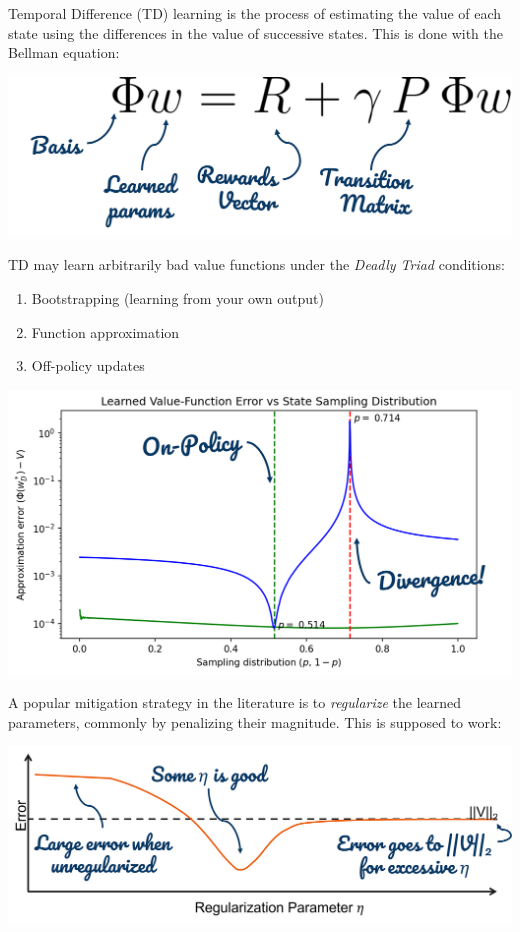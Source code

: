 
Temporal Difference (TD) learning is the process of estimating the value of each state using the differences in the value of successive states. This is done with the Bellman equation:
\begin{center}
    \includegraphics[scale=0.4]{parts/intro/bellman}
\end{center}
TD may learn arbitrarily bad value functions under the \emph{Deadly Triad} conditions:
\begin{enumerate}
    \item Bootstrapping (learning from your own output)
    \item Function approximation
    \item Off-policy updates
\end{enumerate}
\begin{center}
    \includegraphics[scale=0.4]{parts/intro/threestatedivergence}
\end{center}
A popular mitigation strategy in the literature is to \emph{regularize} the learned parameters, commonly by penalizing their magnitude. This is supposed to work:
\begin{center}
    \includegraphics[scale=0.4]{parts/intro/regworks}
\end{center}
